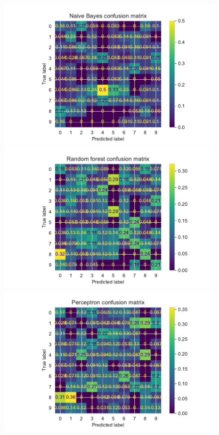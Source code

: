 \documentclass[11pt]{article}
\begin{document}
\begin{figure}[H]
\begin{minipage}[c]{0.5\textwidth}
\includegraphics[width=1\linewidth]{figures/Cifar/CM__NB_BOW.pdf}
\end{minipage}
\begin{minipage}[c]{0.5\textwidth}
\includegraphics[width=1\linewidth]{figures/Cifar/CM__Rndf_BOW.pdf}
\end{minipage}
\begin{minipage}[c]{0.5\textwidth}
\includegraphics[width=1\linewidth]{figures/Cifar/CM__ppn_BOW.pdf}

\end{minipage}
\end{figure}
\end{document}
